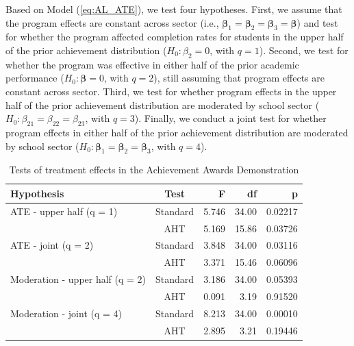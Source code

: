 \documentclass[12pt]{article}\usepackage[]{graphicx}\usepackage[]{color}
\newcommand{\bs}{\boldsymbol}
\begin{document}
Based on Model (\ref{eq:AL_ATE}), we test four hypotheses.%
First, we assume that the program effects are constant across sector (i.e., $\bs\beta_1 = \bs\beta_2 = \bs\beta_3 = \bs\beta$) and test for whether the program affected completion rates for students in the upper half of the prior achievement distribution ($H_0: \beta_2 = 0$, with $q = 1$).
Second, we test for whether the program was effective in either half of the prior academic performance ($H_0: \bs\beta = 0$, with $q = 2$), still assuming that program effects are constant across sector. 
Third, we test for whether program effects in the upper half of the prior achievement distribution are moderated by school sector ($H_0: \beta_{21} = \beta_{22} = \beta_{23}$, with $q = 3$). 
Finally, we conduct a joint test for whether program effects in either half of the prior achievement distribution are moderated by school sector ($H_0: \bs\beta_1 = \bs\beta_2 = \bs\beta_3$, with $q = 4$). 



\begin{table}[bth]
\centering
\caption{Tests of treatment effects in the Achievement Awards Demonstration} 
\label{tab:AAD}
\begin{tabular}{lcrrr}
  \toprule
Hypothesis & Test & F & df & p \\ 
  \midrule
ATE - upper half (q = 1) & Standard & 5.746 & 34.00 & 0.02217 \\ 
   & AHT & 5.169 & 15.86 & 0.03726 \\ 
  ATE - joint (q = 2) & Standard & 3.848 & 34.00 & 0.03116 \\ 
   & AHT & 3.371 & 15.46 & 0.06096 \\ 
   \midrule
Moderation - upper half (q = 2) & Standard & 3.186 & 34.00 & 0.05393 \\ 
   & AHT & 0.091 & 3.19 & 0.91520 \\ 
  Moderation - joint (q = 4) & Standard & 8.213 & 34.00 & 0.00010 \\ 
   & AHT & 2.895 & 3.21 & 0.19446 \\ 
   \bottomrule
\end{tabular}
\end{table}
\end{document}
